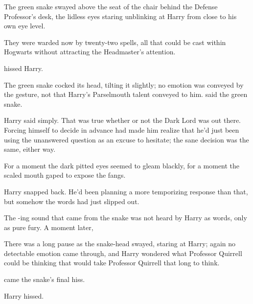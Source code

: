 The green snake swayed above the seat of the chair behind the Defense
Professor's desk, the lidless eyes staring unblinking at Harry from close to
his own eye level.

They were warded now by twenty-two spells, all that could be cast within
Hogwarts without attracting the Headmaster's attention.

 hissed Harry.

The green snake cocked its head, tilting it slightly; no emotion was conveyed
by the gesture, not that Harry's Parselmouth talent conveyed to him.
 said the green snake.

 Harry said simply. That was true whether or not the Dark
Lord was out there. Forcing himself to decide in advance had made him realize
that he'd just been using the unanswered question as an excuse to hesitate; the
sane decision was the same, either way.

For a moment the dark pitted eyes seemed to gleam blackly, for a moment the
scaled mouth gaped to expose the fangs. 

 Harry snapped back.
He'd been planning a more temporizing response than that, but somehow the words
had just slipped out.

The -ing sound that came from the snake was not heard by Harry as
words, only as pure fury. A moment later, 


There was a long pause as the snake-head swayed, staring at Harry; again no
detectable emotion came through, and Harry wondered what Professor Quirrell
could be thinking that would take Professor Quirrell that long to think.

 came the snake's final
hiss. 

 Harry hissed. 

